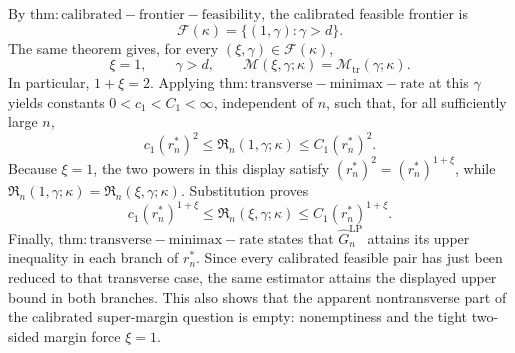 By \(\mathrm{thm:calibrated-frontier-feasibility}\), the calibrated feasible frontier is
\[
\mathcal F(\kappa)=\{(1,\gamma):\gamma>d\}.
\]
The same theorem gives, for every \((\xi,\gamma)\in\mathcal F(\kappa)\),
\[
\xi=1,\qquad \gamma>d,\qquad
\mathcal M(\xi,\gamma;\kappa)=\mathcal M_{\mathrm{tr}}(\gamma;\kappa).
\]
In particular, \(1+\xi=2\). Applying \(\mathrm{thm:transverse-minimax-rate}\) at this \(\gamma\) yields constants \(0<c_1<C_1<\infty\), independent of \(n\), such that, for all sufficiently large \(n\),
\[
c_1(r_n^*)^2
\le \mathfrak R_n(1,\gamma;\kappa)
\le C_1(r_n^*)^2.
\]
Because \(\xi=1\), the two powers in this display satisfy \((r_n^*)^2=(r_n^*)^{1+\xi}\), while \(\mathfrak R_n(1,\gamma;\kappa)=\mathfrak R_n(\xi,\gamma;\kappa)\). Substitution proves
\[
c_1(r_n^*)^{1+\xi}
\le \mathfrak R_n(\xi,\gamma;\kappa)
\le C_1(r_n^*)^{1+\xi}.
\]
Finally, \(\mathrm{thm:transverse-minimax-rate}\) states that \(\widehat G_n^{\mathrm{LP}}\) attains its upper inequality in each branch of \(r_n^*\). Since every calibrated feasible pair has just been reduced to that transverse case, the same estimator attains the displayed upper bound in both branches. This also shows that the apparent nontransverse part of the calibrated super-margin question is empty: nonemptiness and the tight two-sided margin force \(\xi=1\).